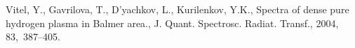 \documentclass[a1]{sciposter}
\begin{document}
\begin{multicols}{3}
\begin{thebibliography}{99}
 Vitel, Y., Gavrilova, T., D'yachkov, L., Kurilenkov, Y.K., Spectra of dense pure hydrogen plasma in Balmer area., J. Quant. Spectrosc. Radiat. Transf.,
  2004, 83,~387--405.

\end{thebibliography}

\end{multicols}
\end{document}
